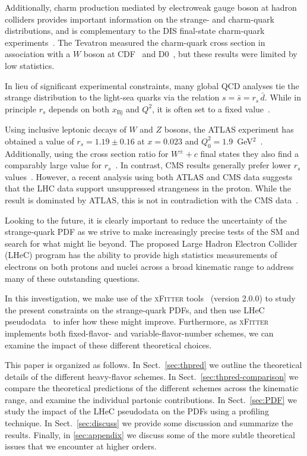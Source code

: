 \documentclass[pdftex,twocolumn,epjc3]{svjour3}          %
\newcommand{\xfitter} {\textsc{xFitter}\xspace}
\newcommand{\xbj}{\ensuremath{x_{\text{Bj}}}\xspace}
\begin{document}
Additionally, charm production mediated by electroweak gauge boson at
hadron colliders provides important information on the strange- and 
charm-quark distributions, and is complementary to the DIS final-state
charm-quark experiments~\cite{Lai:2007dq}.
%
The Tevatron measured the charm-quark cross section in association
with a $W$ boson at CDF~\cite{Aaltonen:2007dm} and
D0~\cite{Abazov:2008qz}, but these results were limited by low
statistics.

In lieu of significant experimental constraints, many global QCD
analyses tie the strange distribution to the light-sea quarks via the
%
relation $s= \bar{s}=r_s \, \bar{d}$.
%
While in principle $r_s$ depends on both \xbj and $Q^2$, it is often
set to a fixed value~\cite{Kretzer:2003it, Martin:2004ir}.

Using inclusive leptonic decays of $W$ and $Z$ bosons, the ATLAS
experiment
has obtained a value of $r_s=1.19 \pm 0.16$  at
$x= 0.023$ and $Q^2_0 = 1.9$~GeV$^2$~\cite{Aaboud:2016btc}.
%
Additionally, using the cross section ratio for $W^\pm +c$ final
states they also find a comparably large value for $r_s$~\cite{Aad:2014xca}.
%
In contrast, CMS results generally prefer lower $r_s$
values~\cite{Chatrchyan:2013uja,Sirunyan:2018hde}.  However, a recent analysis using
both ATLAS and CMS data suggests that the LHC data support
unsuppressed strangeness in the proton. While the result is dominated
by ATLAS, this is not in contradiction with the CMS
data~\cite{Cooper-Sarkar:2018ufj,Aaboud:2016btc,Aad:2014xca,Chatrchyan:2013uja}.

Looking to the future, it is clearly important to reduce the
uncertainty of the strange-quark PDF as we strive to make increasingly
precise tests of the SM and search for what might lie beyond.
%
The proposed Large Hadron Electron Collider (LHeC) program has the
ability to provide high statistics measurements of electrons on both
protons and nuclei across a broad kinematic range to address many of
these outstanding questions.

In this investigation, we make use of the \xfitter
tools~\cite{Alekhin:2014irh} (version 2.0.0) to study the present constraints on the
strange-quark PDFs, and then use LHeC pseudodata~\cite{AbelleiraFernandez:2012cc} to infer how these
might improve. Furthermore, as \xfitter implements both fixed-flavor-
and variable-flavor-number schemes, we can examine the impact of these
different theoretical choices.

%

This paper is organized as follows.
%
In Sect.~\ref{sec:thpred} we outline the theoretical details of the
different heavy-flavor schemes.
%
In Sect.~\ref{sec:thpred-comparison} we compare the theoretical
predictions of the different schemes across the kinematic range, and
examine the individual partonic contributions.
%
In Sect.~\ref{sec:PDF} we study the impact of the LHeC pseudodata on
the PDFs using a profiling technique.
%
In Sect.~\ref{sec:discuss} we provide some discussion and summarize the
results.
%
Finally, in \ref{sec:appendix} we discuss some of the more subtle
theoretical issues that we encounter at higher orders.
\end{document}
